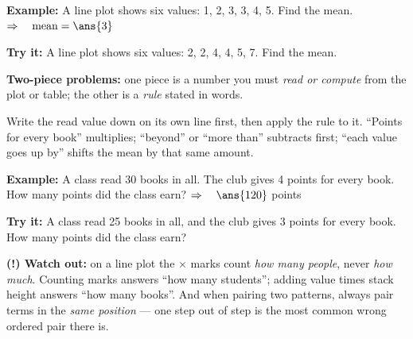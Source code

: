 \documentclass[12pt]{article}
\begin{document}
\begin{examplebox}
\textbf{Example:} \quad A line plot shows six values: 1, 2, 3, 3, 4, 5. Find the mean.
$\Rightarrow\quad \text{mean} = \ans{3}$
\end{examplebox}

\begin{tryitbox}
\textbf{Try it:} \quad A line plot shows six values: 2, 2, 4, 4, 5, 7. Find the
mean.\\[2pt]
\end{tryitbox}


\begin{formulabox}
\textbf{Two-piece problems:} one piece is a number you must \emph{read or compute} from
the plot or table; the other is a \emph{rule} stated in words.\par
\smallskip
Write the read value down on its own line first, then apply the rule to it. ``Points for
every book'' multiplies; ``beyond'' or ``more than'' subtracts first; ``each value goes up
by'' shifts the mean by that same amount.
\end{formulabox}

\begin{examplebox}
\textbf{Example:} \quad A class read 30 books in all. The club gives 4 points for every
book. How many points did the class earn?
$\Rightarrow\quad \ans{120}$ points
\end{examplebox}

\begin{tryitbox}
\textbf{Try it:} \quad A class read 25 books in all, and the club gives 3 points for every
book. How many points did the class earn?\\[2pt]
\end{tryitbox}

\begin{watchoutbox}
\textbf{(!) Watch out:} on a line plot the $\times$ marks count \emph{how many people},
never \emph{how much}. Counting marks answers ``how many students''; adding value times
stack height answers ``how many books''. And when pairing two patterns, always pair terms
in the \emph{same position} --- one step out of step is the most common wrong ordered
pair there is.
\end{watchoutbox}
\end{document}
